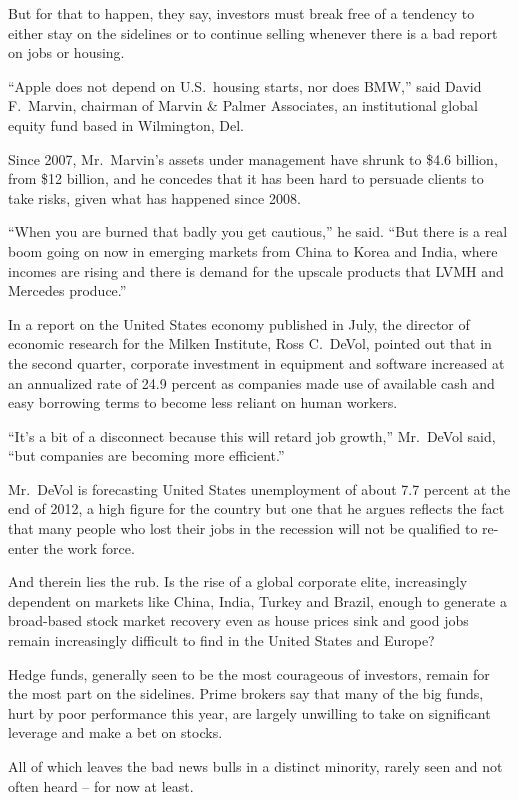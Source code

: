 ﻿\documentclass[12pt]{article}
\begin{document}
But for that to happen, they say, investors must break free of a tendency to either stay on the
sidelines or to continue selling whenever there is a bad report on jobs or housing.

``Apple does not depend on U.S.~housing starts, nor does BMW,'' said David F.~Marvin, chairman of
Marvin \& Palmer Associates, an institutional global equity fund based in Wilmington, Del.

Since 2007, Mr.~Marvin's assets under management have shrunk to \$4.6 billion, from \$12 billion,
and he concedes that it has been hard to persuade clients to take risks, given what has happened
since 2008.

``When you are burned that badly you get cautious,'' he said. ``But there is a real boom going on
now in emerging markets from China to Korea and India, where incomes are rising and there is demand
for the upscale products that LVMH and Mercedes produce.''

In a report on the United States economy published in July, the director of economic research for
the Milken Institute, Ross C.~DeVol, pointed out that in the second quarter, corporate investment in
equipment and software increased at an annualized rate of 24.9 percent as companies made use of
available cash and easy borrowing terms to become less reliant on human workers.

``It's a bit of a disconnect because this will retard job growth,'' Mr.~DeVol said, ``but companies
are becoming more efficient.''

Mr.~DeVol is forecasting United States unemployment of about 7.7 percent at the end of 2012, a high
figure for the country but one that he argues reflects the fact that many people who lost their jobs
in the recession will not be qualified to re-enter the work force.

And therein lies the rub. Is the rise of a global corporate elite, increasingly dependent on markets
like China, India, Turkey and Brazil, enough to generate a broad-based stock market recovery even as
house prices sink and good jobs remain increasingly difficult to find in the United States and
Europe?

Hedge funds, generally seen to be the most courageous of investors, remain for the most part on the
sidelines. Prime brokers say that many of the big funds, hurt by poor performance this year, are
largely unwilling to take on significant leverage and make a bet on stocks.

All of which leaves the bad news bulls in a distinct minority, rarely seen and not often heard --
for now at least.
\end{document}
